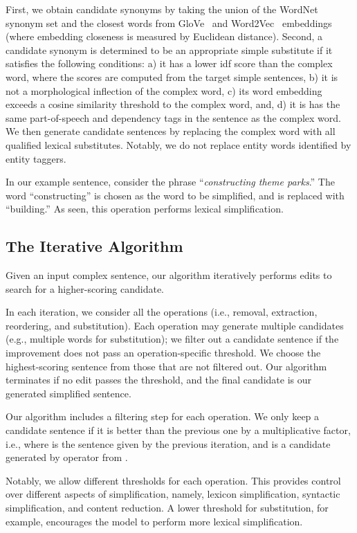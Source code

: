 \documentclass[11pt,a4paper]{article}
\begin{document}
First, we obtain candidate synonyms by taking the union of the WordNet synonym set \cite{miller1995wordnet} and the closest words from GloVe~\cite{pennington2014glove} and Word2Vec~\cite{mikolov2013distributed} embeddings (where embedding closeness is measured by Euclidean distance).  Second, a candidate synonym is determined to be an appropriate simple substitute if it satisfies the following conditions: a) it has a lower idf score than the complex word, where the scores are computed from the target simple sentences, b) it is not a morphological inflection of the complex word, c) its word embedding exceeds a cosine similarity  threshold to the complex word, and, d) it is has the same part-of-speech and dependency tags in the sentence as the complex word. We then generate candidate sentences by replacing the complex word with all qualified lexical substitutes.
Notably, we do not replace entity words identified by entity taggers. 

In our example sentence, consider the phrase ``\textit{constructing theme parks}.'' The word ``constructing'' is chosen as the word to be simplified, and is replaced with ``building.'' As seen, this operation performs lexical simplification.


\subsection{The Iterative Algorithm}
\label{sec:algorithm}

Given an input complex sentence, our algorithm iteratively performs edits to search for a higher-scoring candidate. 

In each iteration, we consider all the operations (i.e., removal, extraction, reordering, and substitution). Each operation may generate multiple candidates (e.g., multiple words for substitution); we filter out a candidate sentence if the improvement does not pass an operation-specific threshold. We choose the highest-scoring sentence from those that are not filtered out. Our algorithm terminates if no edit passes the threshold, and the final candidate is our generated simplified sentence.

Our algorithm includes a filtering step for each operation. We only keep a candidate sentence if it is better than the previous one by a multiplicative factor, i.e., 
 where  is the sentence given by the previous iteration, and  is a candidate generated by operator  from .

Notably, we allow different thresholds for each operation.  This provides control over different aspects of simplification, namely, lexicon simplification, syntactic simplification, and content reduction. A lower threshold for substitution, for example, encourages the model to perform more lexical simplification. 
\end{document}
